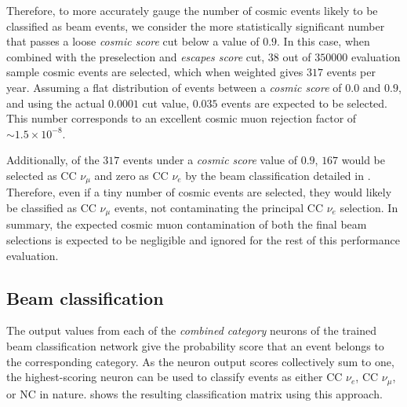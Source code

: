 Therefore, to more accurately gauge the number of cosmic events likely to be classified as beam
events, we consider the more statistically significant number that passes a loose \emph{cosmic
score} cut below a value of $0.9$. In this case, when combined with the preselection and
\emph{escapes score} cut, $38$ out of $350000$ evaluation sample cosmic events are selected, which
when weighted gives $317$ events per year. Assuming a flat distribution of events between a
\emph{cosmic score} of $0.0$ and $0.9$, and using the actual $0.0001$ cut value, $0.035$ events
are expected to be selected. This number corresponds to an excellent cosmic muon rejection factor
of $\sim1.5\times10^{-8}$.

Additionally, of the $317$ events under a \emph{cosmic score} value of $0.9$, $167$ would be
selected as CC $\nu_{\mu}$ and zero as CC $\nu_{e}$ by the beam classification detailed in
. Therefore, even if a tiny number of cosmic events are
selected, they would likely be classified as CC $\nu_{\mu}$ events, not contaminating the
principal CC $\nu_{e}$ selection. In summary, the expected cosmic muon contamination of both the
final beam selections is expected to be negligible and ignored for the rest of this performance
evaluation.

\subsection{Beam classification} %
\label{sec:results_eval_beam} %

The output values from each of the \emph{combined category} neurons of the trained beam
classification network give the probability score that an event belongs to the corresponding
category. As the neuron output scores collectively sum to one, the highest-scoring neuron can be
used to classify events as either CC $\nu_{e}$, CC $\nu_{\mu}$, or NC in nature.
 shows the resulting classification matrix using this
approach.


